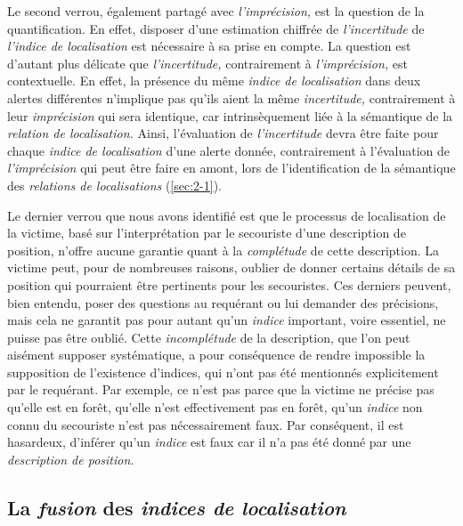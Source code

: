 Le second verrou, également partagé avec \emph{l'imprécision,} est la
question de la quantification. En effet, disposer d'une estimation
chiffrée de \emph{l'incertitude} de \emph{l'indice de localisation}
est nécessaire à sa prise en compte. La question est d'autant plus
délicate que \emph{l'incertitude,} contrairement à
\emph{l'imprécision,} est contextuelle. En effet, la présence du même
\emph{indice de localisation} dans deux alertes différentes n'implique
pas qu'ils aient la même \emph{incertitude,} contrairement à leur
\emph{imprécision} qui sera identique, car intrinsèquement liée à la
sémantique de la \emph{relation de localisation.} Ainsi, l'évaluation
de \emph{l'incertitude} devra être faite pour chaque \emph{indice de
  localisation} d'une alerte donnée, contrairement à l'évaluation de
\emph{l'imprécision} qui peut être faire en amont, lors de
l’identification de la sémantique des \emph{relations de
  localisations} (\autoref{sec:2-1}).

Le dernier verrou que nous avons identifié est que le processus de
localisation de la victime, basé sur l'interprétation par le
secouriste d'une description de position, n'offre aucune garantie
quant à la \emph{complétude} de cette description. La victime peut,
pour de nombreuses raisons, oublier de donner certains détails de sa
position qui pourraient être pertinents pour les secouristes. Ces
derniers peuvent, bien entendu, poser des questions au requérant ou
lui demander des précisions, mais cela ne garantit pas pour autant
qu'un \emph{indice} important, voire essentiel, ne puisse pas être
oublié. Cette \emph{incomplétude} de la description, que l'on peut
aisément supposer systématique, a pour conséquence de rendre
impossible la supposition de l’existence d'indices, qui n'ont pas été
mentionnés explicitement par le requérant. Par exemple, ce n'est pas
parce que la victime ne précise pas qu'elle est en forêt, qu'elle
n'est effectivement pas en forêt, \ie qu'un \emph{indice} non connu du
secouriste n'est pas nécessairement faux. Par conséquent, il est
hasardeux, d'inférer qu'un \emph{indice} est faux car il n'a pas été
donné par une \emph{description de position.}

\subsection{La \emph{fusion} des \emph{indices de localisation}}
\label{subsec:2-1-4}

